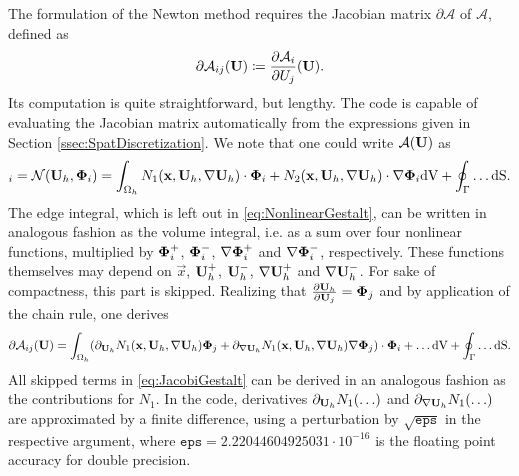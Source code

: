 The formulation of the Newton method requires the Jacobian matrix   $\partial \mathcal{A}$ of $\mathcal{A}$, defined as
\begin{equation}
	\partial \mathcal{A}_{ij}(\textbf{U}) \coloneqq \frac{\partial \mathcal{A}_i}{\partial U_j}(\textbf{U}).
	\label{Eq:Jacobian}
\end{equation}
Its computation is quite straightforward, but lengthy. The \BoSSS code is capable of evaluating the
Jacobian matrix automatically from the expressions given in Section \ref{ssec:SpatDiscretization}.
We note that one could write $\mathcal{A}(\textbf{U})$ as
\begin{equation}
	[\mathcal{A}(\myvector{U})]_i = \mathcal{N}( \myvector{U}_h , \gvec{\Phi}_i) =
	\int_{\Omega_h}
	N_1 (\vec{x}, \myvector{U}_h , \nabla \myvector{U}_h  ) \cdot \gvec{\Phi}_i
	+ N_2 (\vec{x}, \myvector{U}_h , \nabla \myvector{U}_h  ) \cdot \nabla \gvec{\Phi}_i
	\textrm{dV}
	+
	\oint_{\Gamma} \ldots \mathrm{dS}.
	\label{eq:NonlinearGestalt}
\end{equation}
The edge integral, which is left out in \cref{eq:NonlinearGestalt},
can be written in analogous fashion as the volume integral, i.e. as a sum over
four nonlinear functions, multiplied by
$ \boldsymbol{\Phi}_i^{+}$,  $\boldsymbol{\Phi}_i^{-}$, $ \nabla \boldsymbol{\Phi}_i^{+}$ and  $ \nabla \boldsymbol{\Phi}_i^{-}$,
respectively.
These functions themselves may depend on
$\vec{x}$, $\textbf{U}_h^{+}$,  $\textbf{U}_h^{-}$, $\nabla \textbf{U}_h^{+}$ and  $\nabla \textbf{U}_h^{-}$.
For sake of compactness, this part is skipped.
Realizing that $\frac{\partial \textbf{U}_h}{\partial \textbf{U}_j}  = \boldsymbol{\Phi}_j$ and by application of the
chain rule, one derives
\begin{equation}
	\partial \mathcal{A}_{ij}(\textbf{U}) =
	\int_{\Omega_h}
	( \partial_{ \textbf{U}_h}       N_1 (\textbf{x}, \textbf{U}_h , \nabla \textbf{U}_h  ) \boldsymbol{\Phi}_j
	+   \partial_{\nabla \textbf{U}_h} N_1 (\textbf{x}, \textbf{U}_h , \nabla \textbf{U}_h  ) \nabla \boldsymbol{\Phi}_j ) \cdot \boldsymbol{\Phi}_i
	+ \ldots
	\textrm{dV}
	+
	\oint_{\Gamma} \ldots \mathrm{dS} .
	\label{eq:JacobiGestalt}
\end{equation}
All skipped terms in \cref{eq:JacobiGestalt} can be derived in an analogous fashion as the contributions for $N_1$.
In the \BoSSS code, derivatives $ \partial_{ \textbf{U}_h} N_1 ( \ldots )$ and  $ \partial_{ \nabla \textbf{U}_h} N_1 ( \ldots )$
are approximated by a finite difference, using a perturbation by $\sqrt{\mathtt{eps}}$ in the respective argument,
where  $\mathtt{eps} = 2.22044604925031 \cdot 10^{-16}$ is the floating point accuracy for double precision.

